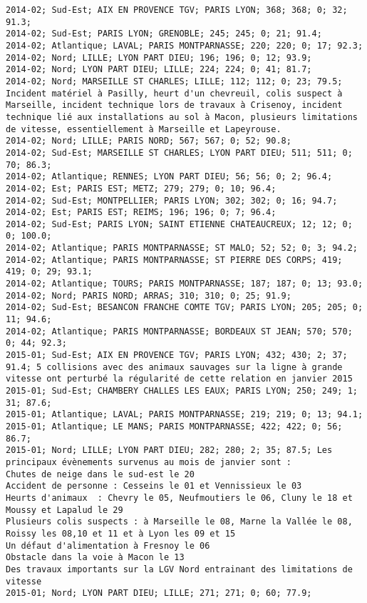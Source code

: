 \documentclass{article}
\begin{document}
\begin{Verbatim}[commandchars=\\\{\}]
2014-02; Sud-Est; AIX EN PROVENCE TGV; PARIS LYON; 368; 368; 0; 32; 91.3; 
2014-02; Sud-Est; PARIS LYON; GRENOBLE; 245; 245; 0; 21; 91.4; 
2014-02; Atlantique; LAVAL; PARIS MONTPARNASSE; 220; 220; 0; 17; 92.3; 
2014-02; Nord; LILLE; LYON PART DIEU; 196; 196; 0; 12; 93.9; 
2014-02; Nord; LYON PART DIEU; LILLE; 224; 224; 0; 41; 81.7; 
2014-02; Nord; MARSEILLE ST CHARLES; LILLE; 112; 112; 0; 23; 79.5; Incident matériel à Pasilly, heurt d'un chevreuil, colis suspect à Marseille, incident technique lors de travaux à Crisenoy, incident technique lié aux installations au sol à Macon, plusieurs limitations de vitesse, essentiellement à Marseille et Lapeyrouse.
2014-02; Nord; LILLE; PARIS NORD; 567; 567; 0; 52; 90.8; 
2014-02; Sud-Est; MARSEILLE ST CHARLES; LYON PART DIEU; 511; 511; 0; 70; 86.3; 
2014-02; Atlantique; RENNES; LYON PART DIEU; 56; 56; 0; 2; 96.4; 
2014-02; Est; PARIS EST; METZ; 279; 279; 0; 10; 96.4; 
2014-02; Sud-Est; MONTPELLIER; PARIS LYON; 302; 302; 0; 16; 94.7; 
2014-02; Est; PARIS EST; REIMS; 196; 196; 0; 7; 96.4; 
2014-02; Sud-Est; PARIS LYON; SAINT ETIENNE CHATEAUCREUX; 12; 12; 0; 0; 100.0; 
2014-02; Atlantique; PARIS MONTPARNASSE; ST MALO; 52; 52; 0; 3; 94.2; 
2014-02; Atlantique; PARIS MONTPARNASSE; ST PIERRE DES CORPS; 419; 419; 0; 29; 93.1; 
2014-02; Atlantique; TOURS; PARIS MONTPARNASSE; 187; 187; 0; 13; 93.0; 
2014-02; Nord; PARIS NORD; ARRAS; 310; 310; 0; 25; 91.9; 
2014-02; Sud-Est; BESANCON FRANCHE COMTE TGV; PARIS LYON; 205; 205; 0; 11; 94.6; 
2014-02; Atlantique; PARIS MONTPARNASSE; BORDEAUX ST JEAN; 570; 570; 0; 44; 92.3; 
2015-01; Sud-Est; AIX EN PROVENCE TGV; PARIS LYON; 432; 430; 2; 37; 91.4; 5 collisions avec des animaux sauvages sur la ligne à grande vitesse ont perturbé la régularité de cette relation en janvier 2015
2015-01; Sud-Est; CHAMBERY CHALLES LES EAUX; PARIS LYON; 250; 249; 1; 31; 87.6; 
2015-01; Atlantique; LAVAL; PARIS MONTPARNASSE; 219; 219; 0; 13; 94.1; 
2015-01; Atlantique; LE MANS; PARIS MONTPARNASSE; 422; 422; 0; 56; 86.7; 
2015-01; Nord; LILLE; LYON PART DIEU; 282; 280; 2; 35; 87.5; Les principaux évènements survenus au mois de janvier sont :
Chutes de neige dans le sud-est le 20 
Accident de personne : Cesseins le 01 et Vennissieux le 03
Heurts d'animaux  : Chevry le 05, Neufmoutiers le 06, Cluny le 18 et Moussy et Lapalud le 29
Plusieurs colis suspects : à Marseille le 08, Marne la Vallée le 08, Roissy les 08,10 et 11 et à Lyon les 09 et 15
Un défaut d'alimentation à Fresnoy le 06
Obstacle dans la voie à Macon le 13
Des travaux importants sur la LGV Nord entrainant des limitations de vitesse
2015-01; Nord; LYON PART DIEU; LILLE; 271; 271; 0; 60; 77.9; 

\end{Verbatim}
\end{document}
